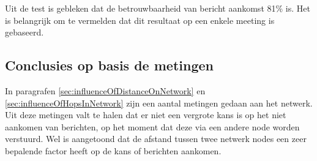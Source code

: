 Uit de test is gebleken dat de betrouwbaarheid van bericht aankomst 81\% is. Het is belangrijk om te vermelden dat dit resultaat op een enkele meeting is gebaseerd.

\subsection{Conclusies op basis de metingen}
In paragrafen \ref{sec:influenceOfDistanceOnNetwork} en \ref{sec:influenceOfHopsInNetwork} zijn een aantal metingen gedaan aan het netwerk. Uit deze metingen valt te halen dat er niet een vergrote kans is op het niet aankomen van berichten, op het moment dat deze via een andere node worden verstuurd. Wel is aangetoond dat de afstand tussen twee netwerk nodes een zeer bepalende factor heeft op de kans of berichten aankomen.